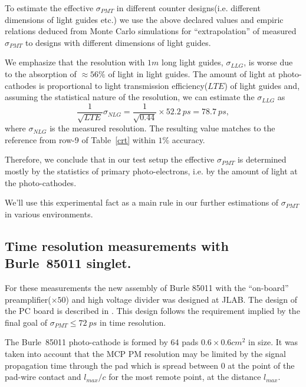 To estimate the effective  $\sigma_{PMT}$ in different counter 
 designs(i.e. different dimensions of  light guides etc.)
we use  the above declared    values and  empiric   relations deduced from  
Monte Carlo  simulations\cite{mutch} for ``extrapolation''
 of measured   $\sigma_{PMT}$ 
 to designs with different dimensions of  light guides.

We emphasize that the resolution with  
$1m$ long light guides, $\sigma_{LLG}$, is  worse   
due to the absorption of   $\approx 56\%$ of light in light guides.
The amount of light at  photo-cathodes is 
proportional to light transmission efficiency($LTE$) of light guides and, 
assuming the statistical nature of  the resolution, 
we can estimate the  $\sigma_{LLG}$  as
%
\begin{equation}
\frac{1}{\sqrt{LTE}}\sigma_{NLG} =\frac{1}{\sqrt{0.44}}\times52.2~ps=78.7~ps,
\label{eq31}
\end{equation}
%
where  $\sigma_{NLG}$ is  the measured resolution. 
The resulting  value  matches to the reference  from row-9 of Table~\ref{crt}  within  $1\%$ accuracy.

Therefore, we conclude that in our test setup 
 the effective  $\sigma_{PMT}$ 
is determined mostly by the statistics of  primary photo-electrons, 
i.e. by the amount of light at  the photo-cathodes.

We'll  use this experimental  fact as a main  rule in our further estimations
 of $\sigma_{PMT}$ in various environments.


\subsection{Time  resolution measurements with Burle~85011 singlet.}
\label{meas85011}

For these measurements the new  assembly of Burle 85011 with the 
 ``on-board'' preamplifier($\times50$) 
and high voltage  divider  was designed at JLAB. The design of the PC board is described 
in \cite{pa85011}. 
This design follows the requirement implied by the final goal of
 $\sigma_{PMT}\le 72~ps$ in time resolution.

The 
Burle~85011 photo-cathode  is formed by 64 pads $0.6\times0.6 cm^2$ in size.
It was taken into account that the MCP PM resolution may be  limited by the signal propagation time
through the pad which is  spread between $0$ 
at the point of the pad-wire contact  and  $l_{max}/c$ for the most remote point, 
at the distance $l_{max}$.
  
